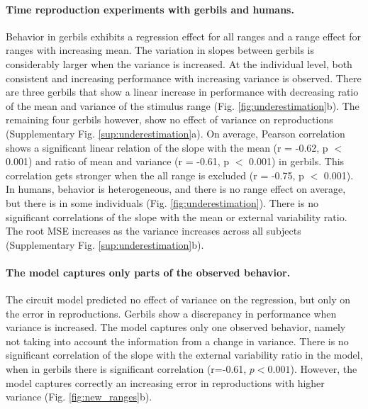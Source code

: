 \documentclass[10pt]{article}
\begin{document}
\paragraph{Time reproduction experiments with gerbils and humans.}
Behavior in gerbils exhibits a regression effect for all ranges and a range effect for ranges with increasing mean. 
The variation in slopes between gerbils is considerably larger when the variance is increased.
At the individual level, both consistent and increasing performance with increasing variance is observed. 
There are three gerbils that show a linear increase in performance with decreasing ratio of the mean and variance of the stimulus range (Fig. \ref{fig:underestimation}b). The remaining four gerbils however, show no effect of variance on reproductions (Supplementary Fig. \ref{sup:underestimation}a).
On average, Pearson correlation shows a significant linear relation of the slope with the mean (r = -0.62, p $<$ 0.001) and ratio of mean and variance (r = -0.61, p $<$ 0.001) in gerbils.
This correlation gets stronger when the all range is excluded (r = -0.75, p $<$ 0.001).
In humans, behavior is heterogeneous, and there is no range effect on average, but there is in some individuals (Fig. \ref{fig:underestimation}). There is no significant correlations of the slope with the mean or external variability ratio.
The root MSE increases as the variance increases across all subjects (Supplementary Fig. \ref{sup:underestimation}b).

\paragraph{The model captures only parts of the observed behavior.}
The circuit model predicted no effect of variance on the regression, but only on the error in reproductions. 
Gerbils show a discrepancy in performance when variance is increased. 
The model captures only one observed behavior, namely not taking into account the information from a change in variance. 
There is no significant correlation of the slope with the external variability ratio in the model, when in gerbils there is significant correlation (r=-0.61, $p<0.001$).
However, the model captures correctly an increasing error in reproductions with higher variance (Fig. \ref{fig:new_ranges}b).

\end{document}
